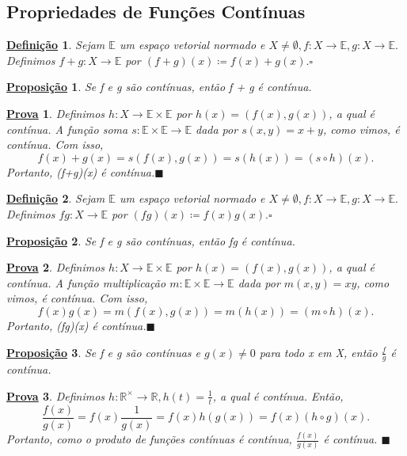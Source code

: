 \documentclass{article}
\newtheorem*{def*}{\underline{Defini\c c\~ao}}
\newtheorem*{prop*}{\underline{Proposi\c c\~ao}}
\newtheorem*{proof*}{\underline{Prova}}
\renewcommand\qedsymbol{$\blacksquare$}
\begin{document}
\subsection{Propriedades de Funções Contínuas}
\begin{def*}
  Sejam \(\mathbb{E}\) um espaço vetorial normado e \(X \neq\emptyset, f:X\rightarrow \mathbb{E}, g:X\rightarrow \mathbb{E}.\)
Definimos \(f+g:X\rightarrow \mathbb{E}\) por \((f+g)(x)\coloneqq f(x)+g(x).\square\)
\end{def*}
\begin{prop*}
  Se f e g são contínuas, então f + g é contínua.
\end{prop*}
\begin{proof*}
  Definimos \(h:X\rightarrow \mathbb{E}\times \mathbb{E}\) por \(h(x) = (f(x), g(x))\), a qual é contínua. A função soma
 \(s:\mathbb{E}\times \mathbb{E}\rightarrow \mathbb{E}\) dada por \(s(x, y) = x + y\), como vimos, é contínua. Com isso, 
   \[
     f(x)+g(x)=s(f(x), g(x)) = s(h(x)) = (s\circ{h})(x).
   \]
  Portanto, (f+g)(x) é contínua.\qedsymbol
\end{proof*}
\begin{def*}
  Sejam \(\mathbb{E}\) um espaço vetorial normado e \(X \neq\emptyset, f:X\rightarrow \mathbb{E}, g:X\rightarrow \mathbb{E}.\)
Definimos \(fg:X\rightarrow \mathbb{E}\) por \((fg)(x)\coloneqq f(x)g(x).\square\)
\end{def*}
\begin{prop*}
  Se f e g são contínuas, então fg é contínua.
\end{prop*}
\begin{proof*}
  Definimos \(h:X\rightarrow \mathbb{E}\times \mathbb{E}\) por \(h(x) = (f(x), g(x))\), a qual é contínua. A função multiplicação
 \(m:\mathbb{E}\times \mathbb{E}\rightarrow \mathbb{E}\) dada por \(m(x, y) = xy\), como vimos, é contínua. Com isso, 
   \[
     f(x)g(x)=m(f(x), g(x)) = m(h(x)) = (m\circ{h})(x).
   \]
  Portanto, (fg)(x) é contínua.\qedsymbol
\end{proof*}
\begin{prop*}
  Se f e g são contínuas e \(g(x)\neq0\) para todo x em X, então \(\frac{f}{g}\) é contínua.
\end{prop*}
\begin{proof*}
  Definimos \(h:\mathbb{R}^{\times}\rightarrow \mathbb{R}, h(t)=\frac{1}{t}\), a qual é contínua. Então, 
    \[
      \frac{f(x)}{g(x)} = f(x)\frac{1}{g(x)} = f(x)h(g(x)) = f(x)(h\circ{g})(x).
    \]
    Portanto, como o produto de funções contínuas é contínua, \(\frac{f(x)}{g(x)}\) é contínua. \qedsymbol
\end{proof*}
\newpage
\end{document}
